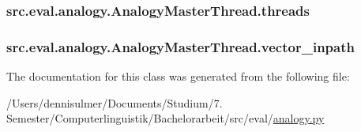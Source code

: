 \subsubsection[{\texorpdfstring{threads}{threads}}]{\setlength{\rightskip}{0pt plus 5cm}src.\+eval.\+analogy.\+Analogy\+Master\+Thread.\+threads}\hypertarget{classsrc_1_1eval_1_1analogy_1_1_analogy_master_thread_a093ad956946c45477e62df9e95460128}{}\label{classsrc_1_1eval_1_1analogy_1_1_analogy_master_thread_a093ad956946c45477e62df9e95460128}
\subsubsection[{\texorpdfstring{vector\+\_\+inpath}{vector\_inpath}}]{\setlength{\rightskip}{0pt plus 5cm}src.\+eval.\+analogy.\+Analogy\+Master\+Thread.\+vector\+\_\+inpath}\hypertarget{classsrc_1_1eval_1_1analogy_1_1_analogy_master_thread_a581000df6b13c7b2d3a06a56097972f0}{}\label{classsrc_1_1eval_1_1analogy_1_1_analogy_master_thread_a581000df6b13c7b2d3a06a56097972f0}


The documentation for this class was generated from the following file\+:\begin{DoxyCompactItemize}
\item 
/\+Users/dennisulmer/\+Documents/\+Studium/7. Semester/\+Computerlinguistik/\+Bachelorarbeit/src/eval/\hyperlink{analogy_8py}{analogy.\+py}\end{DoxyCompactItemize}

